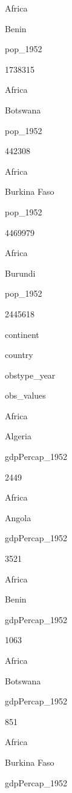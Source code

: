 \documentclass[]{book}
\newenvironment{Shaded}{\begin{snugshade}}{\end{snugshade}}
\newcommand{\CommentTok}[1]{\textcolor[rgb]{0.56,0.35,0.01}{\textit{#1}}}
\newcommand{\KeywordTok}[1]{\textcolor[rgb]{0.13,0.29,0.53}{\textbf{#1}}}
\newcommand{\NormalTok}[1]{#1}
\newcommand{\OperatorTok}[1]{\textcolor[rgb]{0.81,0.36,0.00}{\textbf{#1}}}
\newcommand{\StringTok}[1]{\textcolor[rgb]{0.31,0.60,0.02}{#1}}
\begin{document}
Africa

Benin

pop\_1952

1738315

Africa

Botswana

pop\_1952

442308

Africa

Burkina Faso

pop\_1952

4469979

Africa

Burundi

pop\_1952

2445618

\begin{Shaded}
\end{Shaded}

continent

country

obstype\_year

obs\_values

Africa

Algeria

gdpPercap\_1952

2449

Africa

Angola

gdpPercap\_1952

3521

Africa

Benin

gdpPercap\_1952

1063

Africa

Botswana

gdpPercap\_1952

851

Africa

Burkina Faso

gdpPercap\_1952
\end{document}
